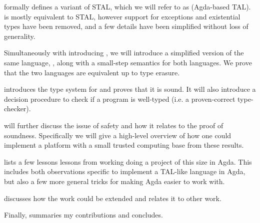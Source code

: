 \textbf{} formally defines a variant of STAL, which we will
refer to as \ATAL (Agda-based TAL). \ATAL is mostly equivalent to STAL, however
support for exceptions and existential types have been removed, and a few
details have been simplified without loss of generality.

Simultaneously with introducing \ATAL, we will introduce a simplified version of
the same language, \ATALe, along with a small-step semantics for both
languages. We prove that the two languages are equivalent up to type erasure.

\textbf{} introduces the type system for \ATAL and proves that
it is sound. It will also introduce a decision procedure to check if a program
is well-typed (i.e. a proven-correct type-checker).

\textbf{} will further discuss the issue of safety and how
it relates to the proof of soundness. Specifically we will give a high-level
overview of how one could implement a platform with a small trusted computing
base from these results.

\textbf{} lists a few lessons lessons from working doing a
project of this size in Agda. This includes both observations specific to
implement a TAL-like language in Agda, but also a few more general tricks for
making Agda easier to work with.

\textbf{} discusses how the work could be extended and relates
it to other work.

Finally, \textbf{} summaries my contributions and
concludes.
